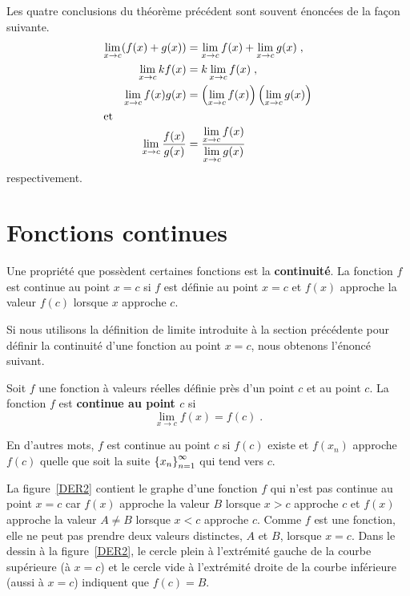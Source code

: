 {Les quatre conclusions du théorème précédent sont souvent énoncées de
la façon suivante.
\begin{align*}
\lim_{x\rightarrow c} (f(x)+g(x)) &= \lim_{x\rightarrow c} f(x) +
\lim_{x\rightarrow c} g(x) \; , \\
\lim_{x\rightarrow c} kf(x) &= k \lim_{x\rightarrow c} f(x) \; , \\
\lim_{x\rightarrow c} f(x)g(x) &= \left(\lim_{x\rightarrow c} f(x)\right) 
\left(\lim_{x\rightarrow c} g(x)\right)  \\
\intertext{et}
\lim_{x\rightarrow c} \frac{f(x)}{g(x)} &=
\frac{\displaystyle \lim_{x\rightarrow c} f(x)}
{\displaystyle \lim_{x\rightarrow c} g(x)}
\end{align*}
respectivement.

\section{Fonctions continues}

Une propriété que possèdent certaines fonctions est la
{\bfseries continuité}.  La fonction $f$ est continue au point $x=c$
si $f$ est définie au point $x=c$ et $f(x)$ approche la valeur $f(c)$
lorsque $x$ approche $c$.

Si nous utilisons la définition de limite introduite à la section
précédente pour définir la continuité d'une fonction au point $x=c$,
nous obtenons l'énoncé suivant.

\begin{defn} 
Soit $f$ une fonction à valeurs réelles définie près d'un point $c$ et
au point $c$.  La fonction $f$ est {\bfseries continue au point $c$}
si
\[
\lim_{x\rightarrow c} f(x) = f(c)  \; .
\]
\end{defn}

En d'autres mots, $f$ est continue au point $c$ si $f(c)$ existe et
$f(x_n)$ approche $f(c)$ quelle que soit la suite
$\displaystyle \left\{x_n\right\}_{n=1}^\infty$ qui tend vers $c$.

La figure~\ref{DER2} contient le graphe d'une fonction $f$ qui
n'est pas continue au point $x=c$ car $f(x)$ approche la valeur $B$
lorsque $x>c$ approche $c$ et $f(x)$ approche la valeur $A\neq B$
lorsque $x<c$ approche $c$.  Comme $f$ est une fonction, elle ne peut
pas prendre deux valeurs distinctes, $A$ et $B$, lorsque $x=c$.  Dans
le dessin à la figure~\ref{DER2}, le cercle plein à l'extrémité gauche de la
courbe supérieure (à $x=c$) et le cercle vide à l'extrémité droite de
la courbe inférieure (aussi à $x=c$) indiquent que $f(c)=B$.

}

